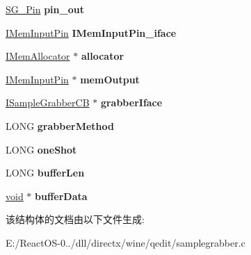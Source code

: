 \begin{DoxyCompactItemize}
\hyperlink{struct___s_g___pin}{S\+G\+\_\+\+Pin} {\bfseries pin\+\_\+out}
\item 
\mbox{\label{struct___s_g___impl_a893542ba2e19ec7796899bd0fcfcc849}} 
\hyperlink{interface_i_mem_input_pin}{I\+Mem\+Input\+Pin} {\bfseries I\+Mem\+Input\+Pin\+\_\+iface}
\item 
\mbox{\label{struct___s_g___impl_ac469630099020ffef3ac077914470a0a}} 
\hyperlink{interface_i_mem_allocator}{I\+Mem\+Allocator} $\ast$ {\bfseries allocator}
\item 
\mbox{\label{struct___s_g___impl_a56ddffe7d7d098a21d55079ec0c8218d}} 
\hyperlink{interface_i_mem_input_pin}{I\+Mem\+Input\+Pin} $\ast$ {\bfseries mem\+Output}
\item 
\mbox{\label{struct___s_g___impl_ab8019d274166304528ef02d3872a646e}} 
\hyperlink{interface_i_sample_grabber_c_b}{I\+Sample\+Grabber\+CB} $\ast$ {\bfseries grabber\+Iface}
\item 
\mbox{\label{struct___s_g___impl_a65c7741ff30b863adae2488c5a6d478d}} 
L\+O\+NG {\bfseries grabber\+Method}
\item 
\mbox{\label{struct___s_g___impl_a39bf79e1079adb174726ceddfa47f705}} 
L\+O\+NG {\bfseries one\+Shot}
\item 
\mbox{\label{struct___s_g___impl_a186c383aab377572b96e9d9bd75733d2}} 
L\+O\+NG {\bfseries buffer\+Len}
\item 
\mbox{\label{struct___s_g___impl_a86f5cfc8828d956ddca15ba9fe3b4aeb}} 
\hyperlink{interfacevoid}{void} $\ast$ {\bfseries buffer\+Data}
\end{DoxyCompactItemize}


该结构体的文档由以下文件生成\+:\begin{DoxyCompactItemize}
\item 
E\+:/\+React\+O\+S-\/0../dll/directx/wine/qedit/samplegrabber.\+c\end{DoxyCompactItemize}

